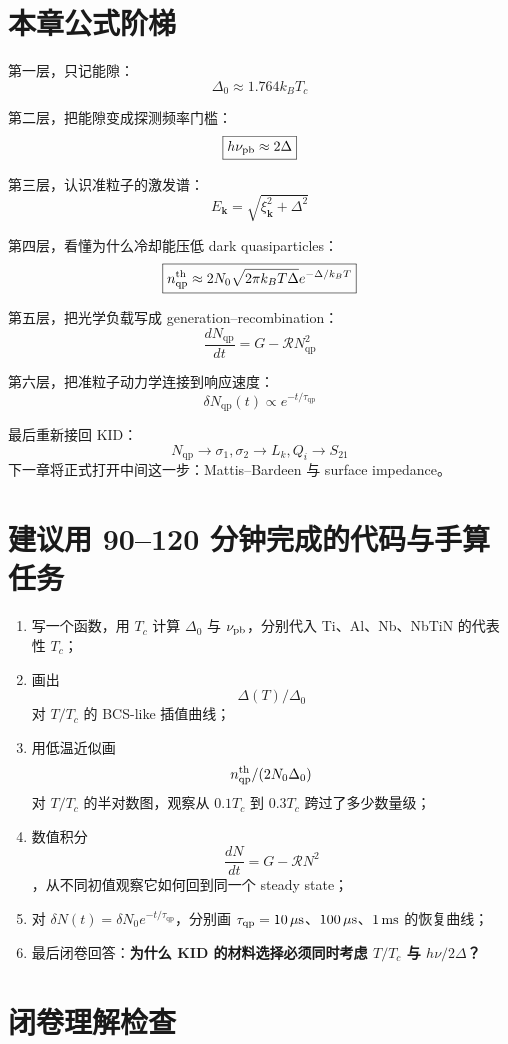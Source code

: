 \documentclass[11pt,a4paper,openany]{ctexrep}
\newcommand{\qp}{\mathrm{qp}}
\begin{document}
\section{本章公式阶梯}

第一层，只记能隙：
\[
\boxed{\Delta_0\approx1.764k_BT_c}
\]

第二层，把能隙变成探测频率门槛：
\[
\boxed{h\nu_{\rm pb}\approx2\Delta}
\]

第三层，认识准粒子的激发谱：
\[
\boxed{E_{\mathbf{k}}=\sqrt{\xi_{\mathbf{k}}^2+\Delta^2}}
\]

第四层，看懂为什么冷却能压低 dark quasiparticles：
\[
\boxed{
n_{\qp}^{\rm th}
\approx
2N_0\sqrt{2\pi k_BT\Delta}
e^{-\Delta/k_BT}
}
\]

第五层，把光学负载写成 generation--recombination：
\[
\boxed{
\frac{dN_{\qp}}{dt}
=
G-\mathcal{R}N_{\qp}^2
}
\]

第六层，把准粒子动力学连接到响应速度：
\[
\boxed{
\delta N_{\qp}(t)\propto e^{-t/\tau_{\qp}}
}
\]

最后重新接回 KID：
\[
\boxed{
N_{\qp}
\rightarrow
\sigma_1,\sigma_2
\rightarrow
L_k,Q_i
\rightarrow
S_{21}
}
\]
下一章将正式打开中间这一步：Mattis--Bardeen 与 surface impedance。

\section{建议用 90--120 分钟完成的代码与手算任务}

\begin{enumerate}
  \item 写一个函数，用 $T_c$ 计算 $\Delta_0$ 与 $\nu_{\rm pb}$，分别代入 Ti、Al、Nb、NbTiN 的代表性 $T_c$；
  \item 画出
  \[
  \Delta(T)/\Delta_0
  \]
  对 $T/T_c$ 的 BCS-like 插值曲线；
  \item 用低温近似画
  \[
  n_{\qp}^{\rm th}/(2N_0\Delta_0)
  \]
  对 $T/T_c$ 的半对数图，观察从 $0.1T_c$ 到 $0.3T_c$ 跨过了多少数量级；
  \item 数值积分
  \[
  \frac{dN}{dt}=G-\mathcal{R}N^2
  \]
  ，从不同初值观察它如何回到同一个 steady state；
  \item 对 $\delta N(t)=\delta N_0e^{-t/\tau_{\qp}}$，分别画 $\tau_{\qp}=10\,\mu{\rm s}$、$100\,\mu{\rm s}$、$1\,{\rm ms}$ 的恢复曲线；
  \item 最后闭卷回答：\textbf{为什么 KID 的材料选择必须同时考虑 $T/T_c$ 与 $h\nu/2\Delta$？}
\end{enumerate}

\section{闭卷理解检查}
\end{document}
